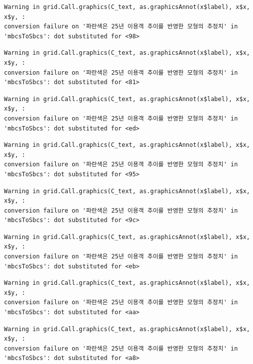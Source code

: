 \documentclass[
  letterpaper,
  DIV=11,
  numbers=noendperiod]{scrreprt}
\begin{document}
\begin{verbatim}
Warning in grid.Call.graphics(C_text, as.graphicsAnnot(x$label), x$x, x$y, :
conversion failure on '파란색은 25년 이용객 추이를 반영한 모형의 추정치' in
'mbcsToSbcs': dot substituted for <98>
\end{verbatim}

\begin{verbatim}
Warning in grid.Call.graphics(C_text, as.graphicsAnnot(x$label), x$x, x$y, :
conversion failure on '파란색은 25년 이용객 추이를 반영한 모형의 추정치' in
'mbcsToSbcs': dot substituted for <81>
\end{verbatim}

\begin{verbatim}
Warning in grid.Call.graphics(C_text, as.graphicsAnnot(x$label), x$x, x$y, :
conversion failure on '파란색은 25년 이용객 추이를 반영한 모형의 추정치' in
'mbcsToSbcs': dot substituted for <ed>
\end{verbatim}

\begin{verbatim}
Warning in grid.Call.graphics(C_text, as.graphicsAnnot(x$label), x$x, x$y, :
conversion failure on '파란색은 25년 이용객 추이를 반영한 모형의 추정치' in
'mbcsToSbcs': dot substituted for <95>
\end{verbatim}

\begin{verbatim}
Warning in grid.Call.graphics(C_text, as.graphicsAnnot(x$label), x$x, x$y, :
conversion failure on '파란색은 25년 이용객 추이를 반영한 모형의 추정치' in
'mbcsToSbcs': dot substituted for <9c>
\end{verbatim}

\begin{verbatim}
Warning in grid.Call.graphics(C_text, as.graphicsAnnot(x$label), x$x, x$y, :
conversion failure on '파란색은 25년 이용객 추이를 반영한 모형의 추정치' in
'mbcsToSbcs': dot substituted for <eb>
\end{verbatim}

\begin{verbatim}
Warning in grid.Call.graphics(C_text, as.graphicsAnnot(x$label), x$x, x$y, :
conversion failure on '파란색은 25년 이용객 추이를 반영한 모형의 추정치' in
'mbcsToSbcs': dot substituted for <aa>
\end{verbatim}

\begin{verbatim}
Warning in grid.Call.graphics(C_text, as.graphicsAnnot(x$label), x$x, x$y, :
conversion failure on '파란색은 25년 이용객 추이를 반영한 모형의 추정치' in
'mbcsToSbcs': dot substituted for <a8>
\end{verbatim}
\end{document}

